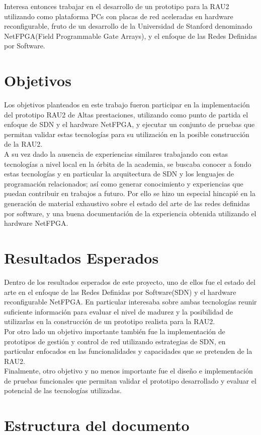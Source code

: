 Interesa entonces trabajar en el desarrollo de un prototipo para la RAU2 utilizando como plataforma PCs con placas de red aceleradas en hardware reconfigurable, fruto de un desarrollo de la Universidad de Stanford denominado NetFPGA(Field Programmable Gate Arrays)\citep{NetFPGA}, y el enfoque de las Redes Definidas por Software.

\section{Objetivos}
Los objetivos planteados en este trabajo fueron participar en la implementación del prototipo RAU2 de Altas prestaciones, utilizando como punto de partida el enfoque de SDN y el hardware NetFPGA, y ejecutar un conjunto de pruebas que permitan validar estas tecnologías para su utilización en  la posible construcción de la RAU2.\\

A su vez dado la ausencia de experiencias similares  trabajando con estas tecnologías a nivel local en la órbita de la academia, se buscaba conocer a fondo estas tecnologías y en particular la arquitectura de SDN y los lenguajes de programación relacionados;  así como generar conocimiento y experiencias que puedan contribuir en trabajos a futuro. Por ello se hizo un especial hincapié en la generación de material exhaustivo sobre el estado del arte de las redes definidas por software, y una buena documentación de la experiencia obtenida utilizando el hardware NetFPGA.

\section{Resultados Esperados}
Dentro de los resultados esperados de este proyecto, uno de ellos fue el estado del arte en el enfoque de las Redes Definidas por Software(SDN) y el hardware reconfigurable NetFPGA. En particular interesaba sobre ambas tecnologías reunir suficiente información para evaluar el nivel de madurez y la posibilidad de utilizarlas en la construcción de un prototipo realista para la RAU2.\\
                   
Por otro lado un objetivo importante también fue la implementación de prototipos de gestión y control de red utilizando estrategias de SDN, en particular enfocados en las funcionalidades y capacidades que se pretenden de la RAU2.\\

Finalmente, otro objetivo y no menos importante fue el diseño e implementación de pruebas funcionales que permitan validar el prototipo desarrollado y evaluar el potencial de las tecnologías utilizadas.

\section{Estructura del documento}

